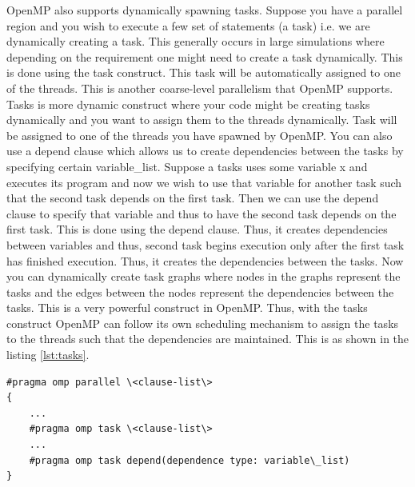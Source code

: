 \documentclass[12pt]{article}
\begin{document}
OpenMP also supports dynamically spawning tasks. Suppose you have a parallel region and you wish to execute a few set of statements (a task) i.e. we are dynamically creating a task.
This generally occurs in large simulations where depending on the requirement one might need to create a task dynamically. This is done using the task construct. This task will be automatically assigned to one of the threads.
This is another coarse-level parallelism that OpenMP supports. Tasks is more dynamic construct where your code might be creating tasks dynamically and you want to assign them to the threads dynamically.
Task will be assigned to one of the threads you have spawned by OpenMP. You can also use a depend clause which allows us to create dependencies between the tasks by specifying 
certain variable\_list. Suppose a tasks uses some variable x and executes its program and now we wish to use that variable for another task such that the second task depends on the first task.
Then we can use the depend clause to specify that variable and thus to have the second task depends on the first task. This is done using the depend clause. Thus, it creates dependencies between variables and thus, second task
begins execution only after the first task has finished execution. Thus, it creates the dependencies between the tasks.
Now you can dynamically create task graphs where nodes in the graphs represent the tasks and the edges between the nodes represent the dependencies between the tasks.
This is a very powerful construct in OpenMP. Thus, with the tasks construct OpenMP can follow its own scheduling mechanism to assign the tasks to the threads such that the dependencies are maintained.
This is as shown in the listing \ref{lst:tasks}.
\begin{lstlisting}[caption={Tasks Construct},captionpos=b,label={lst:tasks}]
#pragma omp parallel \<clause-list\>
{
    ...
    #pragma omp task \<clause-list\>
    ...
    #pragma omp task depend(dependence type: variable\_list)
}
\end{lstlisting}
\end{document}
